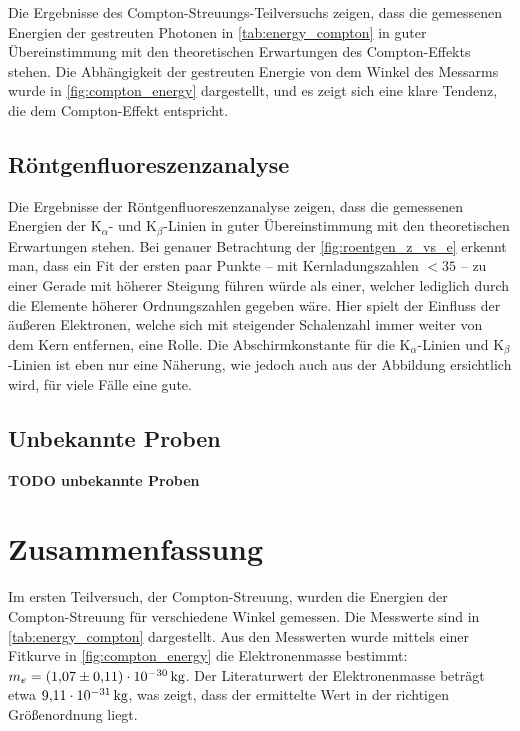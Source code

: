 \documentclass[ngerman]{scrartcl}
\begin{document}
Die Ergebnisse des Compton-Streuungs-Teilversuchs zeigen, dass die gemessenen Energien der gestreuten Photonen in \autoref{tab:energy_compton} in guter Übereinstimmung mit den theoretischen Erwartungen des Compton-Effekts stehen. Die Abhängigkeit der gestreuten Energie von dem Winkel des Messarms wurde in \autoref{fig:compton_energy} dargestellt, und es zeigt sich eine klare Tendenz, die dem Compton-Effekt entspricht.


\subsection{Röntgenfluoreszenzanalyse}
\label{sec:diskussion_roentgen}
Die Ergebnisse der Röntgenfluoreszenzanalyse zeigen, dass die gemessenen Energien der K$_{\alpha}$- und K$_{\beta}$-Linien in guter Übereinstimmung mit den theoretischen Erwartungen stehen. Bei genauer Betrachtung der \autoref{fig:roentgen_z_vs_e} erkennt man, dass ein Fit der ersten paar Punkte -- mit Kernladungszahlen $<35$ -- zu einer Gerade mit höherer Steigung führen würde als einer, welcher lediglich durch die Elemente höherer Ordnungszahlen gegeben wäre. Hier spielt der Einfluss der äußeren Elektronen, welche sich mit steigender Schalenzahl immer weiter von dem Kern entfernen, eine Rolle. Die Abschirmkonstante für die K$_{\alpha}$-Linien und K$_{\beta}$-Linien ist eben nur eine Näherung, wie jedoch auch aus der Abbildung ersichtlich wird, für viele Fälle eine gute.

\subsection{Unbekannte Proben}
\label{sec:diskussion_unbekannt}

\textbf{TODO unbekannte Proben}



\section{Zusammenfassung}
\label{sec:zusammenfassung}

Im ersten Teilversuch, der Compton-Streuung, wurden die Energien der Compton-Streuung für verschiedene Winkel gemessen. Die Messwerte sind in \autoref{tab:energy_compton} dargestellt. Aus den Messwerten wurde mittels einer Fitkurve in \autoref{fig:compton_energy} die Elektronenmasse bestimmt: $m_e = \SI{1.07(11)E-30}{\kilogram}$. Der Literaturwert der Elektronenmasse beträgt etwa $\SI{9.11E-31}{\kilogram}$, was zeigt, dass der ermittelte Wert in der richtigen Größenordnung liegt.
\end{document}
